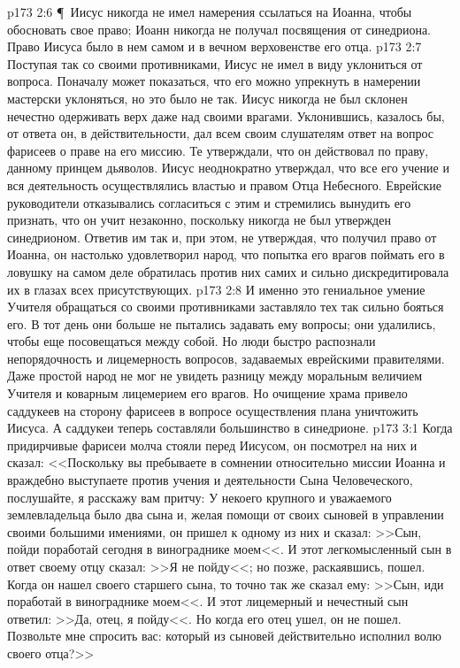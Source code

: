 \vs p173 2:6 \P\ Иисус никогда не имел намерения ссылаться на Иоанна, чтобы обосновать свое право; Иоанн никогда не получал посвящения от синедриона. Право Иисуса было в нем самом и в вечном верховенстве его отца.
\vs p173 2:7 Поступая так со своими противниками, Иисус не имел в виду уклониться от вопроса. Поначалу может показаться, что его можно упрекнуть в намерении мастерски уклоняться, но это было не так. Иисус никогда не был склонен нечестно одерживать верх даже над своими врагами. Уклонившись, казалось бы, от ответа он, в действительности, дал всем своим слушателям ответ на вопрос фарисеев о праве на его миссию. Те утверждали, что он действовал по праву, данному принцем дьяволов. Иисус неоднократно утверждал, что все его учение и вся деятельность осуществлялись властью и правом Отца Небесного. Еврейские руководители отказывались согласиться с этим и стремились вынудить его признать, что он учит незаконно, поскольку никогда не был утвержден синедрионом. Ответив им так и, при этом, не утверждая, что получил право от Иоанна, он настолько удовлетворил народ, что попытка его врагов поймать его в ловушку на самом деле обратилась против них самих и сильно дискредитировала их в глазах всех присутствующих.
\vs p173 2:8 И именно это гениальное умение Учителя обращаться со своими противниками заставляло тех так сильно бояться его. В тот день они больше не пытались задавать ему вопросы; они удалились, чтобы еще посовещаться между собой. Но люди быстро распознали непорядочность и лицемерность вопросов, задаваемых еврейскими правителями. Даже простой народ не мог не увидеть разницу между моральным величием Учителя и коварным лицемерием его врагов. Но очищение храма привело саддукеев на сторону фарисеев в вопросе осуществления плана уничтожить Иисуса. А саддукеи теперь составляли большинство в синедрионе.
\vs p173 3:1 Когда придирчивые фарисеи молча стояли перед Иисусом, он посмотрел на них и сказал: <<Поскольку вы пребываете в сомнении относительно миссии Иоанна и враждебно выступаете против учения и деятельности Сына Человеческого, послушайте, я расскажу вам притчу: У некоего крупного и уважаемого землевладельца было два сына и, желая помощи от своих сыновей в управлении своими большими имениями, он пришел к одному из них и сказал: >>Сын, пойди поработай сегодня в винограднике моем<<. И этот легкомысленный сын в ответ своему отцу сказал: >>Я не пойду<<; но позже, раскаявшись, пошел. Когда он нашел своего старшего сына, то точно так же сказал ему: >>Сын, иди поработай в винограднике моем<<. И этот лицемерный и нечестный сын ответил: >>Да, отец, я пойду<<. Но когда его отец ушел, он не пошел. Позвольте мне спросить вас: который из сыновей действительно исполнил волю своего отца?>>
